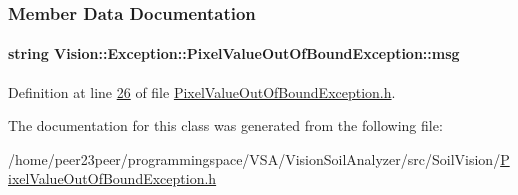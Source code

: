 \subsubsection{Member Data Documentation}
\hypertarget{class_vision_1_1_exception_1_1_pixel_value_out_of_bound_exception_a5e1cb97c34bdedca34b733d5cf16f8c2}{}
\paragraph[{msg}]{\setlength{\rightskip}{0pt plus 5cm}string Vision\+::\+Exception\+::\+Pixel\+Value\+Out\+Of\+Bound\+Exception\+::msg\hspace{0.3cm}{\ttfamily [private]}}\label{class_vision_1_1_exception_1_1_pixel_value_out_of_bound_exception_a5e1cb97c34bdedca34b733d5cf16f8c2}


Definition at line \hyperlink{_pixel_value_out_of_bound_exception_8h_source_l00026}{26} of file \hyperlink{_pixel_value_out_of_bound_exception_8h_source}{Pixel\+Value\+Out\+Of\+Bound\+Exception.\+h}.



The documentation for this class was generated from the following file\+:\begin{DoxyCompactItemize}
\item 
/home/peer23peer/programmingspace/\+V\+S\+A/\+Vision\+Soil\+Analyzer/src/\+Soil\+Vision/\hyperlink{_pixel_value_out_of_bound_exception_8h}{Pixel\+Value\+Out\+Of\+Bound\+Exception.\+h}\end{DoxyCompactItemize}

